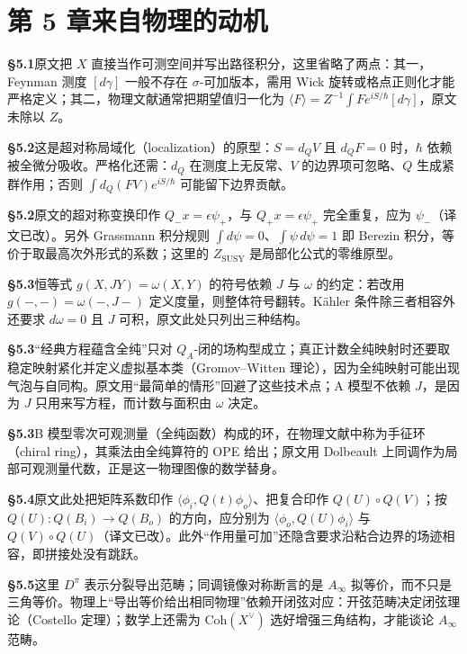 \section*{第 5 章\quad 来自物理的动机}
\noindent\textbf{§5.1}\quad 原文把 $X$ 直接当作可测空间并写出路径积分，这里省略了两点：其一，Feynman 测度 $[d\gamma]$ 一般不存在 $\sigma$-可加版本，需用 Wick 旋转或格点正则化才能严格定义；其二，物理文献通常把期望值归一化为 $\langle F\rangle=Z^{-1}\int F e^{iS/\hbar}[d\gamma]$，原文未除以 $Z$。\par\medskip
\noindent\textbf{§5.2}\quad 这是超对称局域化（localization）的原型：$S=d_QV$ 且 $d_QF=0$ 时，$\hbar$ 依赖被全微分吸收。严格化还需：$d_Q$ 在测度上无反常、$V$ 的边界项可忽略、$Q$ 生成紧群作用；否则 $\int d_Q(FV)e^{iS/\hbar}$ 可能留下边界贡献。\par\medskip
\noindent\textbf{§5.2}\quad 原文的超对称变换印作 $Q_-x=\epsilon\psi_+$，与 $Q_+x=\epsilon\psi_+$ 完全重复，应为 $\psi_-$（译文已改）。另外 Grassmann 积分规则 $\int d\psi=0$、$\int\psi\,d\psi=1$ 即 Berezin 积分，等价于取最高次外形式的系数；这里的 $Z_{\mathrm{SUSY}}$ 是局部化公式的零维原型。\par\medskip
\noindent\textbf{§5.3}\quad 恒等式 $g(X,JY)=\omega(X,Y)$ 的符号依赖 $J$ 与 $\omega$ 的约定：若改用 $g(-,-)=\omega(-,J-)$ 定义度量，则整体符号翻转。Kähler 条件除三者相容外还要求 $d\omega=0$ 且 $J$ 可积，原文此处只列出三种结构。\par\medskip
\noindent\textbf{§5.3}\quad “经典方程蕴含全纯”只对 $Q_A$-闭的场构型成立；真正计数全纯映射时还要取稳定映射紧化并定义虚拟基本类（Gromov--Witten 理论），因为全纯映射可能出现气泡与自同构。原文用“最简单的情形”回避了这些技术点；A 模型不依赖 $J$，是因为 $J$ 只用来写方程，而计数与面积由 $\omega$ 决定。\par\medskip
\noindent\textbf{§5.3}\quad B 模型零次可观测量（全纯函数）构成的环，在物理文献中称为手征环（chiral ring），其乘法由全纯算符的 OPE 给出；原文用 Dolbeault 上同调作为局部可观测量代数，正是这一物理图像的数学替身。\par\medskip
\noindent\textbf{§5.4}\quad 原文此处把矩阵系数印作 $\langle\phi_i,Q(t)\phi_o\rangle$、把复合印作 $Q(U)\circ Q(V)$；按 $Q(U)\colon Q(B_i)\to Q(B_o)$ 的方向，应分别为 $\langle\phi_o,Q(U)\phi_i\rangle$ 与 $Q(V)\circ Q(U)$（译文已改）。此外“作用量可加”还隐含要求沿粘合边界的场迹相容，即拼接处没有跳跃。\par\medskip
\noindent\textbf{§5.5}\quad 这里 $D^\pi$ 表示分裂导出范畴；同调镜像对称断言的是 $A_\infty$ 拟等价，而不只是三角等价。物理上“导出等价给出相同物理”依赖开闭弦对应：开弦范畴决定闭弦理论（Costello 定理）；数学上还需为 $\mathrm{Coh}(X^\vee)$ 选好增强三角结构，才能谈论 $A_\infty$ 范畴。\par\medskip
